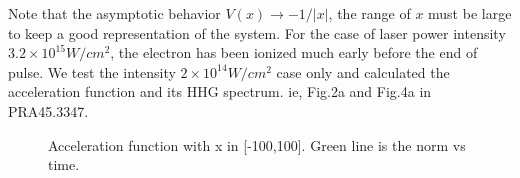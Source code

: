 \documentclass{isildur}
\begin{document}
\begin{itemize}
Note that the asymptotic behavior $V(x)\rightarrow -1/|x|$, the range of $x$ must be large to keep a good representation of the system. For the case of laser power intensity $3.2\times 10^{15} W/cm^2$, the electron has been ionized much early before the end of pulse. We test the intensity $2\times 10^{14} W/cm^2$ case only and calculated the acceleration function and its HHG spectrum. ie, Fig.2a and Fig.4a in PRA45.3347.
\begin{figure}[htbp]
\centering
\mbox{}
\caption{Acceleration function with x in [-100,100]. Green line is the norm vs time.
 }
\end{figure}
\begin{figure}[htbp]
\centering
\mbox{}
\end{figure}
\end{itemize}
\end{document}
